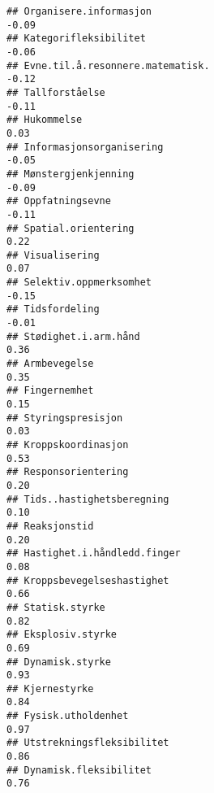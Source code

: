 \documentclass[
]{article}
\begin{document}
\begin{verbatim}
## Organisere.informasjon                                                           -0.09
## Kategorifleksibilitet                                                            -0.06
## Evne.til.å.resonnere.matematisk.                                                 -0.12
## Tallforståelse                                                                   -0.11
## Hukommelse                                                                        0.03
## Informasjonsorganisering                                                         -0.05
## Mønstergjenkjenning                                                              -0.09
## Oppfatningsevne                                                                  -0.11
## Spatial.orientering                                                               0.22
## Visualisering                                                                     0.07
## Selektiv.oppmerksomhet                                                           -0.15
## Tidsfordeling                                                                    -0.01
## Stødighet.i.arm.hånd                                                              0.36
## Armbevegelse                                                                      0.35
## Fingernemhet                                                                      0.15
## Styringspresisjon                                                                 0.03
## Kroppskoordinasjon                                                                0.53
## Responsorientering                                                                0.20
## Tids..hastighetsberegning                                                         0.10
## Reaksjonstid                                                                      0.20
## Hastighet.i.håndledd.finger                                                       0.08
## Kroppsbevegelseshastighet                                                         0.66
## Statisk.styrke                                                                    0.82
## Eksplosiv.styrke                                                                  0.69
## Dynamisk.styrke                                                                   0.93
## Kjernestyrke                                                                      0.84
## Fysisk.utholdenhet                                                                0.97
## Utstrekningsfleksibilitet                                                         0.86
## Dynamisk.fleksibilitet                                                            0.76

\end{verbatim}
\end{document}
